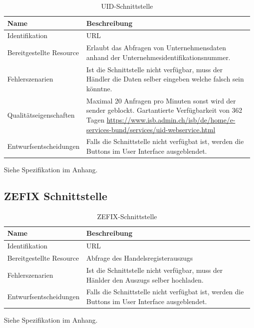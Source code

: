 \begin{table}[H]
	\centering
	\caption{UID-Schnittstelle}
	\begin{tabular}{ | p{4cm} | p{11cm} | }
		\toprule
		{\textbf{Name}} & {\textbf{Beschreibung}} \\
		\midrule
		Identifikation & URL\\ \hline
		Bereitgestellte Resource & Erlaubt das Abfragen von Unternehmensdaten anhand der Unternehmesidentifikationsnummer. \\ \hline
		Fehlerszenarien & Ist die Schnittstelle nicht verfügbar, muss der Händler die Daten selber eingeben welche falsch sein könntne.\\ \hline
		Qualitätseigenschaften & Maximal 20 Anfragen pro Minuten sonst wird der sender geblockt.  Gartantierte Verfügbarkeit von 362 Tagen \url{https://www.isb.admin.ch/isb/de/home/e-services-bund/services/uid-webservice.html}\\ \hline
		Entwurfsentscheidungen & Falls die Schnittstelle nicht verfügbat ist, werden die Buttons im User Interface ausgeblendet.\\
		\bottomrule
	\end{tabular}
\end{table}

Siehe Spezifikation im Anhang.

\subsection{ZEFIX Schnittstelle}

\begin{table}[H]
	\centering
	\caption{ZEFIX-Schnittstelle}
	\begin{tabular}{  | p{4cm} | p{11cm} | }
		\toprule
		{\textbf{Name}} & {\textbf{Beschreibung}} \\
		\midrule
		Identifikation & URL\\ \hline
		Bereitgestellte Resource & Abfrage des Handelsregisterauszugs \\ \hline
		Fehlerszenarien & Ist die Schnittstelle nicht verfügbar, muss der Hänlder den Auszugs selber hochladen.\\ \hline
		Entwurfsentscheidungen & Falls die Schnittstelle nicht verfügbat ist, werden die Buttons im User Interface ausgeblendet.\\
		\bottomrule
	\end{tabular}
\end{table}

Siehe Spezifikation im Anhang.

